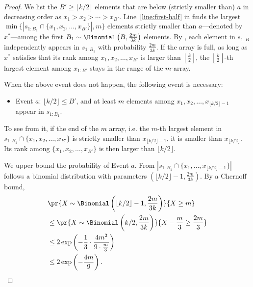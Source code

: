 \begin{proof}
    We list the $B'\ge \lfloor k/2\rfloor$ elements that are below (strictly smaller than) $a$ in decreasing order as $x_1 > x_2 >\cdots > x_{B'}$.
    Line~\ref{line:first-half} in  finds the largest $\min\{|s_{1:B_1}\cap \{x_1, x_2, \ldots, x_{B'}\}|, m\}$ elements  strictly smaller than $a$---denoted by $x^*$---among the first $B_1 \sim \Binomial\left(B, \frac{2m}{3k}\right)$ elements. By , each element in $s_{1:B}$ independently appears in $s_{1:B_1}$ with probability $\frac{2m}{3k}$. If the array is full, as long as $x^*$ satisfies that its rank among $x_1, x_2, \ldots, x_{B'}$ is larger than $\left\lfloor\frac{k}{2}\right\rfloor$, the $\left\lfloor\frac{k}{2}\right\rfloor$-th largest element among $x_{1:B'}$ stays in the range of the $m$-array.

    When the above event does not happen, the following event is necessary:
     \begin{itemize}
        \item Event $a$: $\lfloor k / 2\rfloor  \le B'$, and at least $m$ elements among $x_1, x_2, \ldots, x_{ \lfloor k/2\rfloor - 1}$ appear in $s_{1:B_1}$.
    \end{itemize}
    To see from it, if the end of the $m$ array, i.e. the $m$-th largest element in $s_{1:B_1}\cap \{x_1, x_2, \ldots, x_{B'}\}$ is strictly smaller than $x_{\lfloor k/2\rfloor -1}$, it is smaller than $x_{\lfloor k/2\rfloor}$.  Its rank among $\{x_1, x_2, \ldots, x_{B'}\}$ is then larger than $\lfloor k/2\rfloor $.

    We upper bound the probability of Event $a$. From  $ \left|s_{1:B_1}\cap \{x_1, \ldots, x_{\lfloor k/2\rfloor -1}\}\right|$  follows a binomial distribution with parameters $\left(\lfloor k/2\rfloor -1, \frac{2m}{3k}\right)$. By a Chernoff bound,
    \begin{align}
        & \pr{X\sim \Binomial\left(\lfloor k/2\rfloor -1, \frac{2m}{3k}\right)}{X \ge m} \notag \\
        &\le \pr{X\sim \Binomial\left( k/2, \frac{2m}{3k}\right)}{X- \frac{m}{3} \ge \frac{2m}{3}} \notag \\
        &\le 2\exp\left(-\frac{1}{3}\cdot \frac{4m^2}{9\cdot \frac{m}{3}}\right) \notag \\
        &\le 2\exp\left(-\frac{4m}{9}\right). \notag
    \end{align}
\end{proof}



